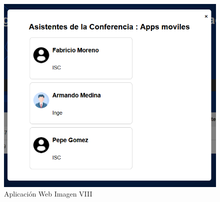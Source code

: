 \begin{figure}[H]
	\centering
	\includegraphics[width=1\linewidth]{Imagenes/web8}
	\caption{Aplicación Web Imagen VIII}
	\label{fig:web8}
\end{figure}

